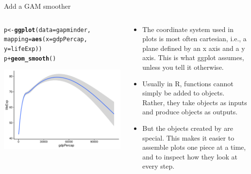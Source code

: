 \documentclass[10pt,handout]{beamer}\usepackage[]{graphicx}\usepackage[]{color}
\makeatletter
\def\maxwidth{ %
  \ifdim\Gin@nat@width>\linewidth
    \linewidth
  \else
    \Gin@nat@width
  \fi
}
\newcommand{\hlopt}[1]{\textcolor[rgb]{0,0,0}{#1}}%
\newcommand{\hlstd}[1]{\textcolor[rgb]{0.345,0.345,0.345}{#1}}%
\newcommand{\hlkwb}[1]{\textcolor[rgb]{0.69,0.353,0.396}{#1}}%
\newcommand{\hlkwc}[1]{\textcolor[rgb]{0.333,0.667,0.333}{#1}}%
\newcommand{\hlkwd}[1]{\textcolor[rgb]{0.737,0.353,0.396}{\textbf{#1}}}%
\newenvironment{kframe}{%
 \def\at@end@of@kframe{}%
 \ifinner\ifhmode%
  \def\at@end@of@kframe{\end{minipage}}%
  \begin{minipage}{\columnwidth}%
 \fi\fi%
 \def\FrameCommand##1{\hskip\@totalleftmargin \hskip-\fboxsep
 \colorbox{shadecolor}{##1}\hskip-\fboxsep
     \hskip-\linewidth \hskip-\@totalleftmargin \hskip\columnwidth}%
 \MakeFramed {\advance\hsize-\width
   \@totalleftmargin\z@ \linewidth\hsize
   \@setminipage}}%
 {\par\unskip\endMakeFramed%
 \at@end@of@kframe}
\newenvironment{knitrout}{}{} %
\makeatother
\begin{document}
\begin{frame}[fragile]{Add a GAM smoother}
	\begin{columns}
		\begin{column}{0.5\textwidth}  %
\begin{knitrout}\tiny
{}\color{fgcolor}\begin{kframe}
\begin{alltt}
\hlstd{p} \hlkwb{<-} \hlkwd{ggplot}\hlstd{(}\hlkwc{data} \hlstd{= gapminder,}
            \hlkwc{mapping} \hlstd{=} \hlkwd{aes}\hlstd{(}\hlkwc{x} \hlstd{= gdpPercap,}
                          \hlkwc{y}\hlstd{=lifeExp))}
\hlstd{p} \hlopt{+} \hlkwd{geom_smooth}\hlstd{()}
\end{alltt}


{\ttfamily\noindent\itshape{}}\end{kframe}

{\centering \includegraphics[width=\maxwidth]{figure/unnamed-chunk-7-1} 

}


\end{knitrout}
		\end{column}
		\begin{column}{0.5\textwidth}
			\begin{itemize}
					\item The coordinate system used in plots is most often cartesian, i.e., a plane defined by an x axis and a y axis. This is	what ggplot assumes, unless you tell it otherwise. \pause 
				\item Usually in R, functions cannot simply be added to objects. Rather, they take objects as inputs and produce objects as outputs.
				\item But the objects created by  are special. This makes it easier to assemble plots one piece at a time, and to inspect how they look at every step. 
			\end{itemize}
		\end{column}
	\end{columns}
\end{frame}
\end{document}
